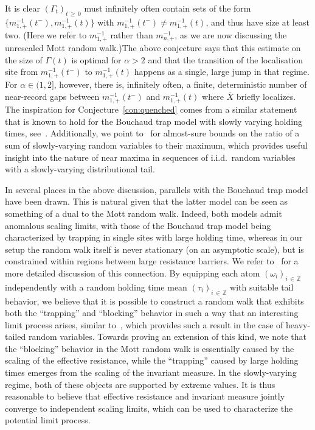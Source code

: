 \documentclass[10pt]{amsart}
\theoremstyle{definition}\newtheorem{defi}[theo]{Definition}\newtheorem{rema}[theo]{Remark}\newtheorem{exam}[theo]{Example}\newtheorem{exem}[theo]{Example}\newtheorem{nota}[theo]{Notation}
\newcommand{\Z}{\mathbb Z}
\begin{document}
\noindent It is clear $(\Gamma_t)_{t\,\geq\,0}$ must infinitely often contain sets of the form $\{ m_{1,+}^{-1}(t^-), m_{1,+}^{-1}(t)\}$ with $m_{1,+}^{-1}(t^-)\neq m_{1,+}^{-1}(t)$, and thus have size at least two. (Here we refer to $m_{1,+}^{-1}$ rather than $m_{n,+}^{-1}$, as we are now discussing the unrescaled Mott random walk.)\linebreak The above conjecture says that this estimate on the size of $\Gamma(t)$ is optimal for $\alpha> 2$ and that the transition of the localisation site from $m_{1,+}^{-1}(t^-)$ to $m_{1,+}^{-1}(t)$ happens as a single, large jump in that regime. For $\alpha\in(1,2]$, however, there is, infinitely often, a finite, deterministic number of near-record gaps between $m_{1,+}^{-1}(t^-)$ and $m_{1,+}^{-1}(t)$ where $\overline X$ briefly localizes. The inspiration for Conjecture~\ref{con:quenched} comes from a similar statement that is known to hold for the Bouchaud trap model with slowly varying holding times, see~\cite{CM2,M15}. Additionally, we point to~\cite[Theorem~1.5]{CM2} for almost-sure bounds on the ratio of a sum of slowly-varying random variables to their maximum, which provides useful insight into the nature of near maxima in sequences of i.i.d.\ random variables with a slowly-varying distributional tail.

In several places in the above discussion, parallels with the Bouchaud trap model have been drawn. This is natural given that the latter model can be seen as something of a dual to the Mott random walk. Indeed, both models admit anomalous scaling limits, with those of the Bouchaud trap model being characterized by trapping in single sites with large holding time, whereas in our setup the random walk itself is never stationary (on an asymptotic scale), but is constrained within regions between large resistance barriers. We refer to~\cite[Section~1.5]{CFJ} for a more detailed discussion of this connection. By equipping each atom $(\omega_i)_{i\,\in\,\Z}$ independently with a random holding time mean $(\tau_i)_{i\,\in\,\Z}$ with suitable tail behavior, we believe that it is possible to construct a random walk that exhibits both the ``trapping'' and ``blocking'' behavior in such a way that an interesting limit process arises, similar to~\cite[Theorem~1.8]{CFJ}, which provides such a result in the case of heavy-tailed random variables. Towards proving an extension of this kind, we note that the ``blocking'' behavior in the Mott random walk is essentially caused by the scaling of the effective resistance, while the ``trapping'' caused by large holding times emerges from the scaling of the invariant measure. In the slowly-varying regime, both of these objects are supported by extreme values. It is thus reasonable to believe that effective resistance and invariant measure jointly converge to independent scaling limits, which can be used to characterize the potential limit process.
\end{document}

